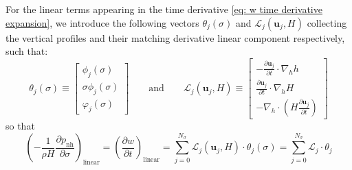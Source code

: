 \documentclass{article}
\newcommand{\Ns}{N_\sigma}
\newcommand{\uj}{\mathbf{u}_j}
\newcommand{\sumj}{\sum_{j=0}^{\Ns}}
\newcommand{\nablah}{\nabla_h}
\newcommand{\pnh}{p_{\text{nh}}}
\newcommand{\ddt}[1]{\frac{\partial #1}{\partial t}}
\newcommand{\dds}[1]{\frac{\partial #1}{\partial \sigma}}
\newcommand{\vphij}{\varphi_j}
\begin{document}
For the linear terms appearing in the time derivative \eqref{eq: w time derivative expansion}, we introduce the following vectors $\theta_j(\sigma)$ and $\mathcal{L}_j(\uj, H)$ collecting the vertical profiles and their matching derivative linear component respectively, such that:
\begin{equation}
    \theta_j(\sigma) \equiv \begin{bmatrix} 
    \phi_j(\sigma) \\[1mm] 
    \sigma \phi_j(\sigma) \\[1mm] 
    \vphij(\sigma) 
    \end{bmatrix}
    \qquad \text{and} \qquad \mathcal{L}_j(\uj, H) \equiv \begin{bmatrix} 
    -\frac{\partial \uj}{\partial t} \cdot \nablah h\\[1mm]
    \frac{\partial \uj}{\partial t} \cdot \nablah H \\[1mm]
    -\nablah \cdot\left(H \frac{\partial \uj}{\partial t}\right) 
    \end{bmatrix}
    \label{eq: def nh pressure derivative linear terms vectors}
\end{equation}
so that
$$\left(-\frac{1}{\rho H}\dds{\pnh} \right)_{\text{linear}} = \left(\ddt{w}\right)_{\text{linear}} = \sumj \mathcal{L}_j(\uj, H)\cdot \theta _j(\sigma) = \sumj\mathcal{L}_j\cdot \theta _j$$
\end{document}

